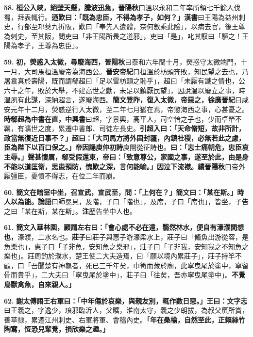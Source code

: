 \textbf{58.} \textbf{桓公入峽，絕壁天懸，騰波迅急，}{\footnotesize \textbf{晉陽秋}曰溫以永和二年率所領七千餘人伐蜀，拜表輒行。}\textbf{迺歎曰：「既為忠臣，不得為孝子，如何？」}{\footnotesize \textbf{漢書}曰王陽為益州刺史，行部至邛僰九折阪，歎曰「奉先人遺體，奈何數乘此險」，以病去官，後王尊為刺史，至其阪，問吏曰「非王陽所畏之道邪」，吏曰「是」，叱其馭曰「驅之！王陽為孝子，王尊為忠臣」。}

\textbf{59.} \textbf{初，熒惑入太微，尋廢海西，}{\footnotesize \textbf{晉陽秋}曰泰和六年閏十月，熒惑守太微端門，十一月，大司馬桓溫廢帝為海西公。\textbf{晉安帝紀}曰桓溫於枋頭奔敗，知民望之去也，乃屠袁真於壽陽，既而謂郗超曰「足以雪枋頭之恥乎」，超曰「未厭有識之情也，公六十之年，敗於大舉，不建高世之勳，未足以鎮厭民望」，因說溫以廢立之事，時溫夙有此謀，深納超言，遂廢海西。}\textbf{簡文登阼，復入太微，帝惡之，}{\footnotesize \textbf{徐廣晉紀}曰咸安元年十二月，熒惑逆行入太微，至二年七月猶在焉，帝懲海西之事，心甚憂之。}\textbf{時郗超為中書在直，}{\footnotesize \textbf{中興書}曰超，字景興，高平人，司空愔之子也，少而卓犖不羈，有曠世之度，累遷中書郎、司徒左長史。}\textbf{引超入曰：「天命脩短，故非所計，政當無復近日事不？」超曰：「大司馬方將外固封疆，內鎮社稷，必無若此之慮，臣為陛下以百口保之。」帝因誦庾仲初詩}{\footnotesize 庾闡從征詩也。}\textbf{曰：「志士痛朝危，忠臣哀主辱。」聲甚悽厲，郗受假還東，帝曰：「致意尊公，家國之事，遂至於此，由是身不能以道匡衛，思患預防，愧歎之深，言何能喻。」因泣下流襟。}{\footnotesize \textbf{續晉陽秋}曰帝外厭彊臣，憂憤不得志，在位二年而崩。}

\textbf{60.} \textbf{簡文在暗室中坐，召宣武，宣武至，問：「上何在？」簡文曰：「某在斯。」時人以為能。}{\footnotesize \textbf{論語}曰師冕見，及階，子曰「階也」，及席，子曰「席也」，皆坐，子告之曰「某在斯，某在斯」。\textbf{注}歷告坐中人也。}

\textbf{61.} \textbf{簡文入華林園，顧謂左右曰：「會心處不必在遠，翳然林水，便自有濠濮間想也，}{\footnotesize 濠濮，二水名也。\textbf{莊子}曰莊子與惠子游濠梁水上，莊子曰「鯈魚出游從容，是魚樂也」，惠子曰「子非魚，安知魚之樂邪」，莊子曰「子非我，安知我之不知魚之樂也」。莊周釣於濮水，楚王使二大夫造焉，曰「願以境內累莊子」，莊子持竿不顧，曰「吾聞楚有神龜者，死已三千年矣，巾笥而藏於廟，此寧曳尾於塗中，寧留骨而貴乎」，二大夫曰「寧曳尾於塗中」，莊子曰「往矣，吾亦寧曳尾塗中」。}\textbf{不覺鳥獸禽魚，自來親人。」}

\textbf{62.} \textbf{謝太傅語王右軍曰：「中年傷於哀樂，與親友別，輒作數日惡。」王曰：}{\footnotesize \textbf{文字志}曰王羲之，字逸少，琅邪臨沂人，父曠，淮南太守，羲之少朗拔，為叔父廙所賞，善草隸，累遷江州刺史、右軍將軍、會稽內史。}\textbf{「年在桑榆，自然至此，正賴絲竹陶寫，恆恐兒輩覺，損欣樂之趣。」}

